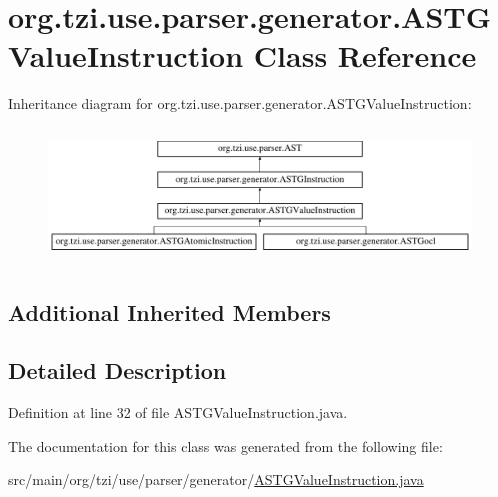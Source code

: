\hypertarget{classorg_1_1tzi_1_1use_1_1parser_1_1generator_1_1_a_s_t_g_value_instruction}{\section{org.\-tzi.\-use.\-parser.\-generator.\-A\-S\-T\-G\-Value\-Instruction Class Reference}
\label{classorg_1_1tzi_1_1use_1_1parser_1_1generator_1_1_a_s_t_g_value_instruction}
}
Inheritance diagram for org.\-tzi.\-use.\-parser.\-generator.\-A\-S\-T\-G\-Value\-Instruction\-:\begin{figure}[H]
\begin{center}
\leavevmode
\includegraphics[height=3.589744cm]{classorg_1_1tzi_1_1use_1_1parser_1_1generator_1_1_a_s_t_g_value_instruction}
\end{center}
\end{figure}
\subsection*{Additional Inherited Members}


\subsection{Detailed Description}


Definition at line 32 of file A\-S\-T\-G\-Value\-Instruction.\-java.



The documentation for this class was generated from the following file\-:\begin{DoxyCompactItemize}
\item 
src/main/org/tzi/use/parser/generator/\hyperlink{_a_s_t_g_value_instruction_8java}{A\-S\-T\-G\-Value\-Instruction.\-java}\end{DoxyCompactItemize}

